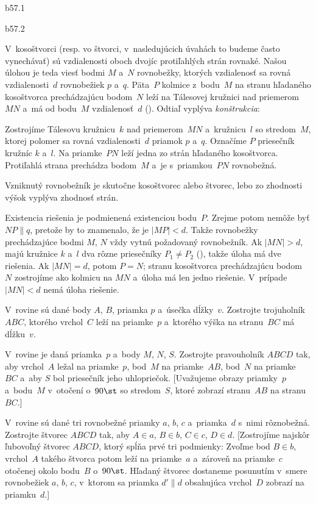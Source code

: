 {%
\epsplace b57.1 \hfil\Obr\par
\epsplace b57.2 \hfil\Obr

V~kosoštvorci (resp. vo štvorci, v~nasledujúcich úvahách to budeme často vynechávať) sú
vzdialenosti oboch dvojíc protiľahlých strán rovnaké. Našou úlohou je
teda viesť bodmi $M$ a~$N$ rovnobežky, ktorých vzdialenosť sa rovná vzdialenosti~$d$
rovnobežiek $p$ a~$q$. Päta~$P$ kolmice z~bodu~$M$ na stranu hľadaného
kosoštvorca prechádzajúcu bodom~$N$ leží na Tálesovej kružnici nad
priemerom~$MN$ a~má od bodu~$M$ vzdialenosť~$d$ (\obr).
\inspicture{}
Odtiaľ vyplýva {\it konštrukcia}:

Zostrojíme Tálesovu kružnicu~$k$ nad priemerom~$MN$
a~kružnicu~$l$ so stredom~$M$, ktorej polomer sa rovná vzdialenosti~$d$
priamok $p$ a~$q$. Označíme $P$ priesečník kružníc $k$ a~$l$. Na
priamke~$PN$ leží jedna zo strán hľadaného kosoštvorca. Protiľahlá
strana prechádza bodom~$M$ a~je s~priamkou~$PN$ rovnobežná.

Vzniknutý rovnobežník je skutočne kosoštvorec alebo štvorec, lebo zo
zhodnosti výšok vyplýva zhodnosť strán.
\inspicture{}

\diskusia
Existencia riešenia je podmienená existenciou bodu~$P$. Zrejme potom nemôže
byť $NP\parallel q$, pretože by to znamenalo, že je $|MP|<d$. Takže
rovnobežky prechádzajúce bodmi $M$, $N$ vždy vytnú požadovaný rovnobežník.
Ak $|MN|>d$, majú kružnice $k$ a~$l$ dva rôzne priesečníky
$P_1\ne P_2$ (\obr),
takže úloha má dve riešenia. Ak $|MN|=d$, potom
$P=N$; stranu kosoštvorca prechádzajúcu bodom~$N$ zostrojíme ako
kolmicu na $MN$ a~úloha má len jedno riešenie. V~prípade $|MN|<d$
nemá úloha riešenie.


V~rovine sú dané body $A$, $B$, priamka $p$ a~úsečka dĺžky~$v$.
Zostrojte trojuholník $ABC$, ktorého vrchol~$C$ leží na priamke~$p$
a~ktorého výška na stranu~$BC$ má dĺžku~$v$.

\D%
V~rovine je daná priamka~$p$ a~body $M$, $N$, $S$. Zostrojte
pravouholník $ABCD$ tak, aby vrchol~$A$ ležal na priamke~$p$, bod~$M$
na priamke~$AB$, bod~$N$ na priamke~$BC$ a~aby $S$ bol priesečník
jeho uhlopriečok. [Uvažujeme obrazy priamky~$p$ a~bodu~$M$
v~otočení o~$90\st$ so stredom~$S$, ktoré zobrazí stranu~$AB$
na stranu~$BC$.]

V~rovine sú dané tri rovnobežné priamky $a$, $b$, $c$ a~priamka~$d$
s~nimi rôznobežná. Zostrojte štvorec $ABCD$ tak, aby $A\in a$,
$B\in b$, $C\in c$, $D\in d$.
[Zostrojíme najskôr ľubovoľný štvorec $ABCD$, ktorý spĺňa prvé
tri podmienky: Zvoľme bod $B\in b$, vrchol~$A$ takého štvorca
potom leží na priamke~$a$ a~zároveň na priamke~$c$ otočenej okolo bodu~$B$
o~$90\st$. Hľadaný štvorec dostaneme posunutím v~smere rovnobežiek
$a$, $b$, $c$, v~ktorom sa priamka $d'\parallel d$ obsahujúca vrchol~$D$
zobrazí na priamku~$d$.]
}


